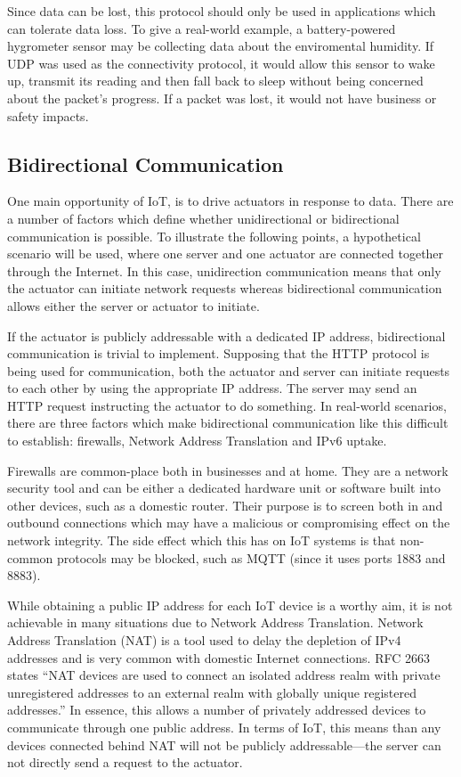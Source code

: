         Since data can be lost, this protocol should only be used in applications which can tolerate data loss. To give a real-world example, a battery-powered hygrometer sensor may be collecting data about the enviromental humidity. If UDP was used as the connectivity protocol, it would allow this sensor to wake up, transmit its reading and then fall back to sleep without being concerned about the packet's progress. If a packet was lost, it would not have business or safety impacts.

    \subsection{Bidirectional Communication}
    \label{bidirectioncomms}
      One main opportunity of IoT, is to drive actuators in response to data. There are a number of factors which define whether unidirectional or bidirectional communication is possible. To illustrate the following points, a hypothetical scenario will be used, where one server and one actuator are connected together through the Internet. In this case, unidirection communication means that only the actuator can initiate network requests whereas bidirectional communication allows either the server or actuator to initiate.

      If the actuator is publicly addressable with a dedicated IP address, bidirectional communication is trivial to implement. Supposing that the HTTP protocol is being used for communication, both the actuator and server can initiate requests to each other by using the appropriate IP address. The server may send an HTTP request instructing the actuator to do something. In real-world scenarios, there are three factors which make bidirectional communication like this difficult to establish: firewalls, Network Address Translation and IPv6 uptake.

      Firewalls are common-place both in businesses and at home. They are a network security tool and can be either a dedicated hardware unit or software built into other devices, such as a domestic router. Their purpose is to screen both in and outbound connections which may have a malicious or compromising effect on the network integrity. The side effect which this has on IoT systems is that non-common protocols may be blocked, such as MQTT (since it uses ports 1883 and 8883).

      While obtaining a public IP address for each IoT device is a worthy aim, it is not achievable in many situations due to Network Address Translation. Network Address Translation (NAT) is a tool used to delay the depletion of IPv4 addresses and is very common with domestic Internet connections. RFC 2663 \citep{rfc2663} states ``NAT devices are used to connect an isolated address realm with private unregistered addresses to an external realm with globally unique registered addresses.'' In essence, this allows a number of privately addressed devices to communicate through one public address. In terms of IoT, this means than any devices connected behind NAT will not be publicly addressable---the server can not directly send a request to the actuator.


